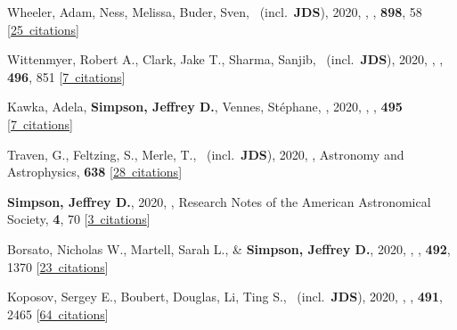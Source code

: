 \item[{\color{numcolor}\scriptsize46}] Wheeler, Adam, Ness, Melissa, Buder, Sven, \etal\ (incl.\ \textbf{JDS}), 2020, , \apj, \textbf{898}, 58 [\href{https://ui.adsabs.harvard.edu/#abs/2020ApJ...898...58W}{25~citations}]

\item[{\color{numcolor}\scriptsize45}] Wittenmyer, Robert A., Clark, Jake T., Sharma, Sanjib, \etal\ (incl.\ \textbf{JDS}), 2020, , \mnras, \textbf{496}, 851 [\href{https://ui.adsabs.harvard.edu/#abs/2020MNRAS.496..851W}{7~citations}]

\item[{\color{numcolor}\scriptsize44}] Kawka, Adela, \textbf{Simpson, Jeffrey D.}, Vennes, St{\'e}phane, \etal, 2020, , \mnras, \textbf{495} [\href{https://ui.adsabs.harvard.edu/#abs/2020MNRAS.495L.129K}{7~citations}]

\item[{\color{numcolor}\scriptsize43}] Traven, G., Feltzing, S., Merle, T., \etal\ (incl.\ \textbf{JDS}), 2020, , Astronomy and Astrophysics, \textbf{638} [\href{https://ui.adsabs.harvard.edu/#abs/2020A&A...638A.145T}{28~citations}]

\item[{\color{numcolor}\scriptsize42}] \textbf{Simpson, Jeffrey D.}, 2020, , Research Notes of the American Astronomical Society, \textbf{4}, 70 [\href{https://ui.adsabs.harvard.edu/#abs/2020RNAAS...4...70S}{3~citations}]

\item[{\color{numcolor}\scriptsize41}] Borsato, Nicholas W., Martell, Sarah L., \& \textbf{Simpson, Jeffrey D.}, 2020, , \mnras, \textbf{492}, 1370 [\href{https://ui.adsabs.harvard.edu/#abs/2020MNRAS.492.1370B}{23~citations}]

\item[{\color{numcolor}\scriptsize40}] Koposov, Sergey E., Boubert, Douglas, Li, Ting S., \etal\ (incl.\ \textbf{JDS}), 2020, , \mnras, \textbf{491}, 2465 [\href{https://ui.adsabs.harvard.edu/#abs/2020MNRAS.491.2465K}{64~citations}]

